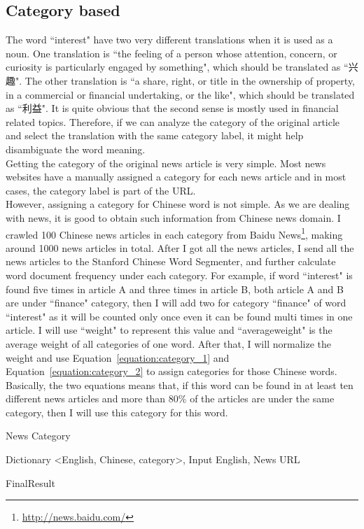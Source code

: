 \documentclass[11pt]{article}
\begin{document}
\subsection{Category based}
The word ``interest" have two very different translations when it is used as a noun. One translation is ``the feeling of a person whose attention, concern, or curiosity is particularly engaged by something", which should be translated as ``兴趣". The other translation is ``a share, right, or title in the ownership of property, in a commercial or financial undertaking, or the like", which should be translated as ``利益". It is quite obvious that the second sense is mostly used in financial related topics. Therefore, if we can analyze the category of the original article and 
select the translation with the same category label, it might help disambiguate the word meaning.
\\
Getting the category of the original news article is very simple. Most news websites have a manually assigned a category for each news article and in most cases, the category label is part of the URL.
\\
However, assigning a category for Chinese word is not simple. As we are dealing with news, it is good to obtain such information from Chinese news domain. I crawled 100 Chinese news articles in each category from  Baidu News\footnote{\url{http://news.baidu.com/}}, making around 1000 news articles in total. After I got all the news articles, I send all the news articles to the Stanford Chinese Word Segmenter, and further calculate word document frequency under each  category. For example, if word ``interest" is found five times in article A and three times in article B, both article A and B are under ``finance" category, then I will add two for category ``finance" of word ``interest" as it will be counted only once even it can be found multi times in one article. I will use ``weight" to represent this value and ``averageweight" is the average weight of all categories of one word. After that, I will normalize the weight and use Equation~\ref{equation:category_1} and Equation~\ref{equation:category_2} to assign categories for those Chinese words. Basically, the two equations means that, if this word can be found in at least ten different news articles and more than 80\% of the articles are under the same category, then I will use this category for this word.
\begin{algorithm}[ht]
\caption{News Category}
\label{algorithm:wsd_2}
\begin{algorithmic}
\REQUIRE Dictionary \textless English, Chinese, category\textgreater, Input English, News URL

        \ENDIF
    \ENDFOR
\ENDIF
\RETURN FinalResult

\end{algorithmic}
\end{algorithm}
\end{document}

